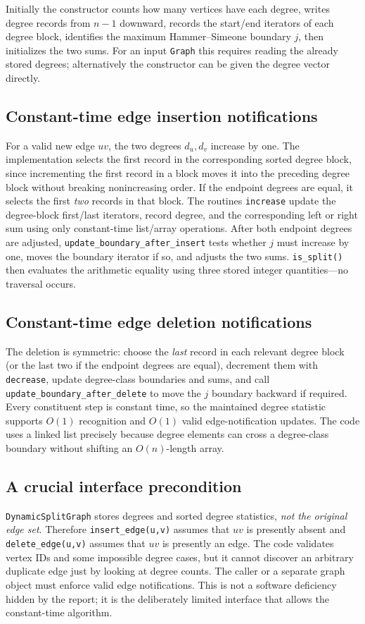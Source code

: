 Initially the constructor counts how many vertices have each degree, writes degree records from \(n-1\) downward, records the start/end iterators of each degree block, identifies the maximum Hammer--Simeone boundary \(j\), then initializes the two sums.  For an input \texttt{Graph} this requires reading the already stored degrees; alternatively the constructor can be given the degree vector directly.

\subsection{Constant-time edge insertion notifications}
For a valid new edge \(uv\), the two degrees \(d_u,d_v\) increase by one.  The implementation selects the first record in the corresponding sorted degree block, since incrementing the first record in a block moves it into the preceding degree block without breaking nonincreasing order.  If the endpoint degrees are equal, it selects the first \emph{two} records in that block.  The routines \texttt{increase} update the degree-block first/last iterators, record degree, and the corresponding left or right sum using only constant-time list/array operations.  After both endpoint degrees are adjusted, \texttt{update\_boundary\_after\_insert} tests whether \(j\) must increase by one, moves the boundary iterator if so, and adjusts the two sums.  \texttt{is\_split()} then evaluates the arithmetic equality using three stored integer quantities---no traversal occurs.

\subsection{Constant-time edge deletion notifications}
The deletion is symmetric: choose the \emph{last} record in each relevant degree block (or the last two if the endpoint degrees are equal), decrement them with \texttt{decrease}, update degree-class boundaries and sums, and call \texttt{update\_boundary\_after\_delete} to move the \(j\) boundary backward if required.  Every constituent step is constant time, so the maintained degree statistic supports \(O(1)\) recognition and \(O(1)\) valid edge-notification updates.  The code uses a linked list precisely because degree elements can cross a degree-class boundary without shifting an \(O(n)\)-length array.

\subsection{A crucial interface precondition}
\texttt{DynamicSplitGraph} stores degrees and sorted degree statistics, \emph{not the original edge set}.  Therefore \texttt{insert\_edge(u,v)} assumes that \(uv\) is presently absent and \texttt{delete\_edge(u,v)} assumes that \(uv\) is presently an edge.  The code validates vertex IDs and some impossible degree cases, but it cannot discover an arbitrary duplicate edge just by looking at degree counts.  The caller or a separate graph object must enforce valid edge notifications.  This is not a software deficiency hidden by the report; it is the deliberately limited interface that allows the constant-time algorithm.

